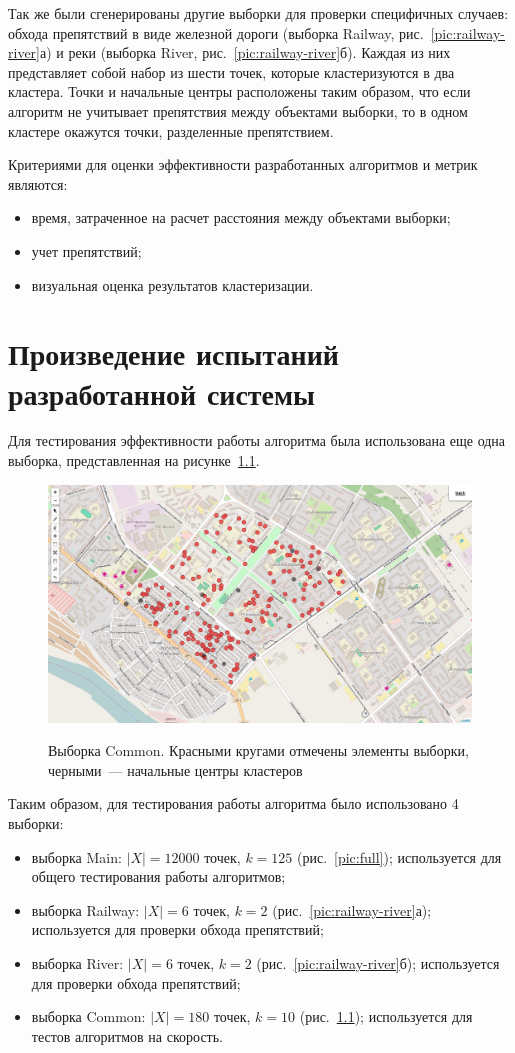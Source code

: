 \documentclass[a4paper, 14pt]{extreport}
\begin{document}
Так же были сгенерированы другие выборки для проверки специфичных случаев: обхода препятствий в виде железной дороги (выборка Railway, рис.~\ref{pic:railway-river}а) и реки (выборка River, рис.~\ref{pic:railway-river}б). Каждая из них представляет собой набор из шести точек, которые кластеризуются в два кластера. Точки и начальные центры расположены таким образом, что если алгоритм не учитывает препятствия между объектами выборки, то в одном кластере окажутся точки, разделенные препятствием.

Критериями для оценки эффективности разработанных алгоритмов и метрик являются:
\begin{itemize}
    \item время, затраченное на расчет расстояния между объектами выборки;
    \item учет препятствий;
    \item визуальная оценка результатов кластеризации.
\end{itemize}

    \chapter{Произведение испытаний разработанной системы}
    Для тестирования эффективности работы алгоритма была использована еще одна выборка, представленная на рисунке~\ref{pic:common}.
\begin{figure}[h!]
    \centering
    \includegraphics[width=.7\textwidth]{test_common-contrast}\\[1ex]
    \parbox{.9\textwidth}{\caption{Выборка Common. Красными кругами отмечены элементы выборки, черными~--- начальные центры кластеров}\label{pic:common}}
\end{figure}
    
    Таким образом, для тестирования работы алгоритма было использовано 4 выборки:
\begin{itemize}
    \item выборка Main: \( |X| = 12 000 \) точек, \( k = 125 \) (рис.~\ref{pic:full}); используется для общего тестирования работы алгоритмов;
    \item выборка Railway: \( |X| = 6 \) точек, \( k = 2 \) (рис.~\ref{pic:railway-river}а); используется для проверки обхода препятствий;
    \item выборка River: \( |X| = 6 \) точек, \( k = 2 \) (рис.~\ref{pic:railway-river}б); используется для проверки обхода препятствий;
    \item выборка Common: \( |X| = 180 \) точек, \( k = 10 \) (рис.~\ref{pic:common}); используется для тестов алгоритмов на скорость.
\end{itemize}
\end{document}
